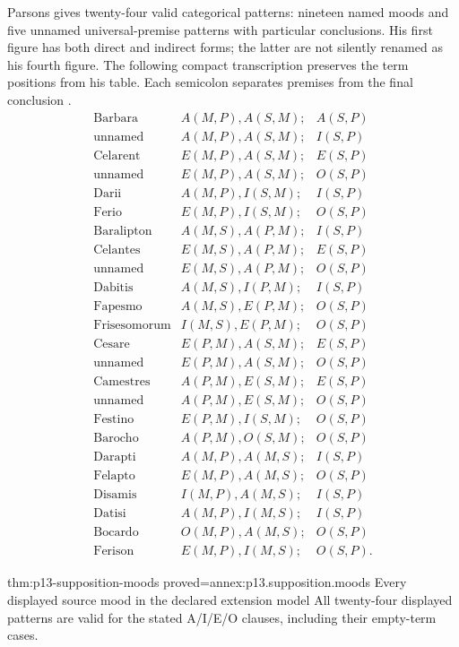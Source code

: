 Parsons gives twenty-four valid categorical patterns: nineteen named
moods and five unnamed universal-premise patterns with particular
conclusions. His first figure has both direct and indirect forms;
the latter are not silently renamed as his fourth figure. The following
compact transcription preserves the term positions from his table.
Each semicolon separates premises from the final conclusion
\cite[pp.~166--168]{Parsons2007FordhamSupposition}.
\[
\begin{array}{lll}
\text{Barbara}&A(M,P),A(S,M);&A(S,P)\\
\text{unnamed}&A(M,P),A(S,M);&I(S,P)\\
\text{Celarent}&E(M,P),A(S,M);&E(S,P)\\
\text{unnamed}&E(M,P),A(S,M);&O(S,P)\\
\text{Darii}&A(M,P),I(S,M);&I(S,P)\\
\text{Ferio}&E(M,P),I(S,M);&O(S,P)\\[2pt]
\text{Baralipton}&A(M,S),A(P,M);&I(S,P)\\
\text{Celantes}&E(M,S),A(P,M);&E(S,P)\\
\text{unnamed}&E(M,S),A(P,M);&O(S,P)\\
\text{Dabitis}&A(M,S),I(P,M);&I(S,P)\\
\text{Fapesmo}&A(M,S),E(P,M);&O(S,P)\\
\text{Frisesomorum}&I(M,S),E(P,M);&O(S,P)\\[2pt]
\text{Cesare}&E(P,M),A(S,M);&E(S,P)\\
\text{unnamed}&E(P,M),A(S,M);&O(S,P)\\
\text{Camestres}&A(P,M),E(S,M);&E(S,P)\\
\text{unnamed}&A(P,M),E(S,M);&O(S,P)\\
\text{Festino}&E(P,M),I(S,M);&O(S,P)\\
\text{Barocho}&A(P,M),O(S,M);&O(S,P)\\[2pt]
\text{Darapti}&A(M,P),A(M,S);&I(S,P)\\
\text{Felapto}&E(M,P),A(M,S);&O(S,P)\\
\text{Disamis}&I(M,P),A(M,S);&I(S,P)\\
\text{Datisi}&A(M,P),I(M,S);&I(S,P)\\
\text{Bocardo}&O(M,P),A(M,S);&O(S,P)\\
\text{Ferison}&E(M,P),I(M,S);&O(S,P).
\end{array}
\]

\begin{hbtheorem}{thm:p13-supposition-moods}
 {proved=annex:p13.supposition.moods}
 {Every displayed source mood in the declared extension model}
All twenty-four displayed patterns are valid for the stated A/I/E/O
clauses, including their empty-term cases.
\end{hbtheorem}

